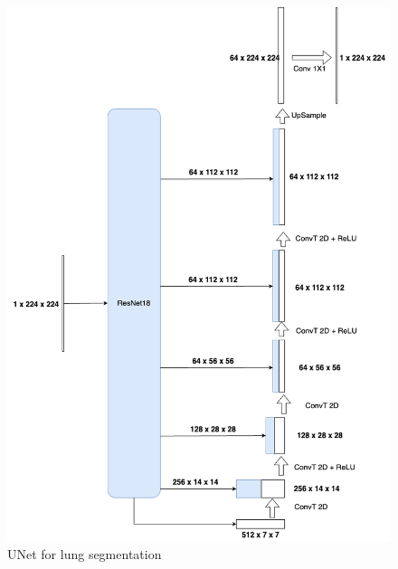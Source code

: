 \begin{figure}[htbp]
    \centering
    \includegraphics[width=\linewidth]{images/Unet-segmentation.png}
    \caption{UNet for lung segmentation}
    \label{fig:unet_lung}
\end{figure}